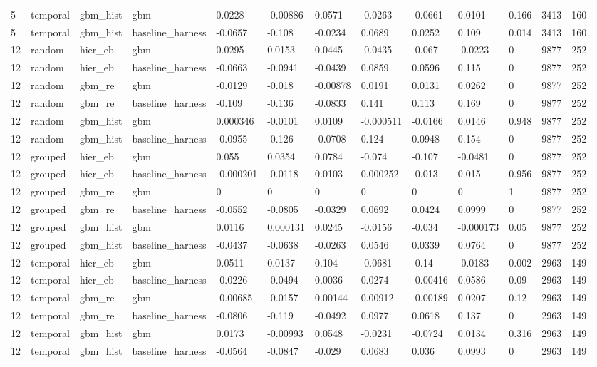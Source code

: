 \begin{tabular}{lllllllllllll}
5 & temporal & gbm\_hist & gbm & 0.0228 & -0.00886 & 0.0571 & -0.0263 & -0.0661 & 0.0101 & 0.166 & 3413 & 160 \\
5 & temporal & gbm\_hist & baseline\_harness & -0.0657 & -0.108 & -0.0234 & 0.0689 & 0.0252 & 0.109 & 0.014 & 3413 & 160 \\
12 & random & hier\_eb & gbm & 0.0295 & 0.0153 & 0.0445 & -0.0435 & -0.067 & -0.0223 & 0 & 9877 & 252 \\
12 & random & hier\_eb & baseline\_harness & -0.0663 & -0.0941 & -0.0439 & 0.0859 & 0.0596 & 0.115 & 0 & 9877 & 252 \\
12 & random & gbm\_re & gbm & -0.0129 & -0.018 & -0.00878 & 0.0191 & 0.0131 & 0.0262 & 0 & 9877 & 252 \\
12 & random & gbm\_re & baseline\_harness & -0.109 & -0.136 & -0.0833 & 0.141 & 0.113 & 0.169 & 0 & 9877 & 252 \\
12 & random & gbm\_hist & gbm & 0.000346 & -0.0101 & 0.0109 & -0.000511 & -0.0166 & 0.0146 & 0.948 & 9877 & 252 \\
12 & random & gbm\_hist & baseline\_harness & -0.0955 & -0.126 & -0.0708 & 0.124 & 0.0948 & 0.154 & 0 & 9877 & 252 \\
12 & grouped & hier\_eb & gbm & 0.055 & 0.0354 & 0.0784 & -0.074 & -0.107 & -0.0481 & 0 & 9877 & 252 \\
12 & grouped & hier\_eb & baseline\_harness & -0.000201 & -0.0118 & 0.0103 & 0.000252 & -0.013 & 0.015 & 0.956 & 9877 & 252 \\
12 & grouped & gbm\_re & gbm & 0 & 0 & 0 & 0 & 0 & 0 & 1 & 9877 & 252 \\
12 & grouped & gbm\_re & baseline\_harness & -0.0552 & -0.0805 & -0.0329 & 0.0692 & 0.0424 & 0.0999 & 0 & 9877 & 252 \\
12 & grouped & gbm\_hist & gbm & 0.0116 & 0.000131 & 0.0245 & -0.0156 & -0.034 & -0.000173 & 0.05 & 9877 & 252 \\
12 & grouped & gbm\_hist & baseline\_harness & -0.0437 & -0.0638 & -0.0263 & 0.0546 & 0.0339 & 0.0764 & 0 & 9877 & 252 \\
12 & temporal & hier\_eb & gbm & 0.0511 & 0.0137 & 0.104 & -0.0681 & -0.14 & -0.0183 & 0.002 & 2963 & 149 \\
12 & temporal & hier\_eb & baseline\_harness & -0.0226 & -0.0494 & 0.0036 & 0.0274 & -0.00416 & 0.0586 & 0.09 & 2963 & 149 \\
12 & temporal & gbm\_re & gbm & -0.00685 & -0.0157 & 0.00144 & 0.00912 & -0.00189 & 0.0207 & 0.12 & 2963 & 149 \\
12 & temporal & gbm\_re & baseline\_harness & -0.0806 & -0.119 & -0.0492 & 0.0977 & 0.0618 & 0.137 & 0 & 2963 & 149 \\
12 & temporal & gbm\_hist & gbm & 0.0173 & -0.00993 & 0.0548 & -0.0231 & -0.0724 & 0.0134 & 0.316 & 2963 & 149 \\
12 & temporal & gbm\_hist & baseline\_harness & -0.0564 & -0.0847 & -0.029 & 0.0683 & 0.036 & 0.0993 & 0 & 2963 & 149 \\
\bottomrule
\end{tabular}